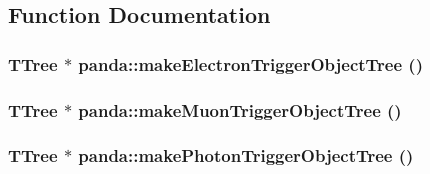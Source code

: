 \subsection{Function Documentation}
\hypertarget{namespacepanda_a364615e31f3eb9ebbf653623a50c3c21}{
\subsubsection[{makeElectronTriggerObjectTree}]{\setlength{\rightskip}{0pt plus 5cm}TTree $\ast$ panda::makeElectronTriggerObjectTree ()}}
\label{namespacepanda_a364615e31f3eb9ebbf653623a50c3c21}
\hypertarget{namespacepanda_a683a6f452183115c3480de39e72d17d9}{
\subsubsection[{makeMuonTriggerObjectTree}]{\setlength{\rightskip}{0pt plus 5cm}TTree $\ast$ panda::makeMuonTriggerObjectTree ()}}
\label{namespacepanda_a683a6f452183115c3480de39e72d17d9}
\hypertarget{namespacepanda_ac00a6d91076afaad98db1f2cf8e27b53}{
\subsubsection[{makePhotonTriggerObjectTree}]{\setlength{\rightskip}{0pt plus 5cm}TTree $\ast$ panda::makePhotonTriggerObjectTree ()}}
\label{namespacepanda_ac00a6d91076afaad98db1f2cf8e27b53}


